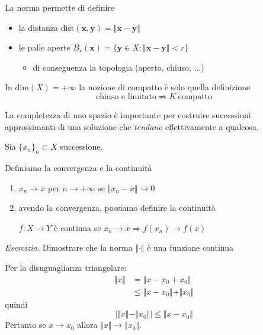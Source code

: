 \documentclass[10pt,a4paper,twoside,openright]{book}
\newcommand{\x}{\mathbf{x}}
\newcommand{\y}{\mathbf{y}}
\begin{document}
La norma permette di definire
\begin{itemize}
    \item la distanza $\text{dist}(\x,\y) =\Vert \x-\y\Vert $
    \item le palle aperte $B_{r}(\x) =\{\y\in X:\Vert \x-\y\Vert < r\}$
          \begin{itemize}
              \item di conseguenza la topologia (aperto, chiuso, ...)
          \end{itemize}
\end{itemize}
\begin{nb}
    In $\mathrm{dim}(X) =+\infty $ la nozione di compatto è solo quella definizione
    \begin{equation*}
        \text{chiuso e limitato} \nRightarrow K\ \text{compatto}
    \end{equation*}
\end{nb}
La completezza di uno spazio è importante per costruire successioni approssimanti di una soluzione che \textit{tendano} effettivamente a qualcosa.

Sia $\{x_{n}\}_{n} \subset X$ successione.
\begin{definition}
    Definiamo la convergenza e la continuità
    \begin{enumerate}
        \item $x_{n}\rightarrow \overline{x}$ per $n\rightarrow +\infty $ se $\Vert x_{n} -\overline{x}\Vert \rightarrow 0$
        \item avendo la convergenza, possiamo definire la continuità

              $f:X\rightarrow Y$ è continua se $x_{n}\rightarrow \overline{x} \Rightarrow f(x_{n})\rightarrow f(\overline{x})$
    \end{enumerate}
\end{definition}

\textit{Esercizio.} Dimostrare che la norma $\Vert \cdotp \Vert $ è una funzione continua

Per la disuguaglianza triangolare:
\begin{align*}
    \Vert x\Vert & =\Vert x-x_{0} +x_{0}\Vert                     \\
                 & \leqslant \Vert x-x_{0}\Vert +\Vert x_{0}\Vert
\end{align*}
quindi
\begin{equation*}
    \Big| \Vert x\Vert -\Vert x_{0}\Vert \Big|\leqslant \Vert x-x_{0}\Vert
\end{equation*}
Pertanto se $x\rightarrow x_{0}$ allora $\Vert x\Vert \rightarrow \Vert x_{0}\Vert $.
\end{document}
